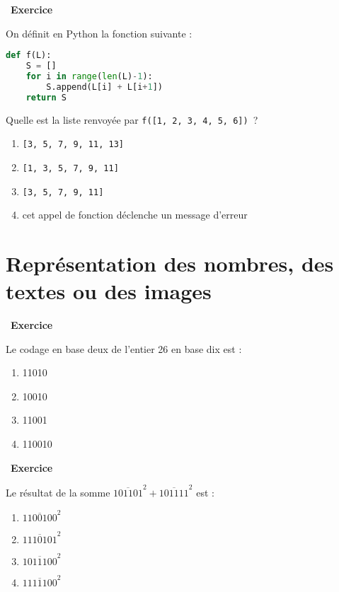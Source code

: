 \documentclass[
  11pt,
]{article}
\newcommand{\passthrough}[1]{#1}
\providecommand{\tightlist}{%
  \setlength{\itemsep}{0pt}\setlength{\parskip}{0pt}}
\newcounter{exo}
\newenvironment{exercice}[1]
{\par \medskip   \addtocounter{exo}{1} \noindent  
\begin{bclogo}[arrondi =0.1,   noborder = true, logo=\bccrayon, marge=4]{~\textbf{Exercice} \textbf{\theexo} {\itshape #1} }  \par}
{
\end{bclogo}
 \par \bigskip }
\newcounter{def}
\begin{document}
\begin{exercice}{}

On définit en Python la fonction suivante :

\begin{lstlisting}[language=Python]
def f(L):
    S = []
    for i in range(len(L)-1):
        S.append(L[i] + L[i+1])
    return S
\end{lstlisting}

Quelle est la liste renvoyée par
\passthrough{\lstinline!f([1, 2, 3, 4, 5, 6])!}~?

\begin{enumerate}
\def\labelenumi{\arabic{enumi}.}
\tightlist
\item
  \passthrough{\lstinline![3, 5, 7, 9, 11, 13]!}
\item
  \passthrough{\lstinline![1, 3, 5, 7, 9, 11]!}
\item
  \passthrough{\lstinline![3, 5, 7, 9, 11]!}
\item
  cet appel de fonction déclenche un message d'erreur
\end{enumerate}

\end{exercice}

\hypertarget{repruxe9sentation-des-nombres-des-textes-ou-des-images}{%
\section{Représentation des nombres, des textes ou des
images}\label{repruxe9sentation-des-nombres-des-textes-ou-des-images}}

\begin{exercice}{}

Le codage en base deux de l'entier 26 en base dix est :

\begin{enumerate}
\def\labelenumi{\arabic{enumi}.}
\tightlist
\item
  11010
\item
  10010
\item
  11001
\item
  110010
\end{enumerate}

\end{exercice}

\begin{exercice}{}

Le résultat de la somme
\(\overline{101101}^{2} + \overline{101111}^{2}\) est :

\begin{enumerate}
\def\labelenumi{\arabic{enumi}.}
\tightlist
\item
  \(\overline{1100100}^{2}\)
\item
  \(\overline{1110101}^{2}\)
\item
  \(\overline{1011100}^{2}\)
\item
  \(\overline{1111100}^{2}\)
\end{enumerate}

\end{exercice}
\end{document}
